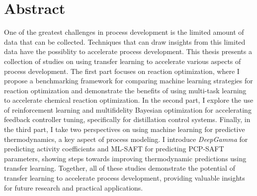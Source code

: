 \begingroup
\let\clearpage\relax
\let\cleardoublepage\relax
\let\cleardoublepage\relax

\chapter*{Abstract}

One of the greatest challenges in process development is the limited amount of data that can be collected. Techniques that can draw insights from this limited data have the possiblity to accelerate process development. This thesis presents a collection of studies on using transfer learning to accelerate various aspects of process development. The first part focuses on reaction optimization, where I propose a benchmarking framework for comparing machine learning strategies for reaction optimization and demonstrate the benefits of using multi-task learning to accelerate chemical reaction optimization. In the second part, I explore the use of reinforcement learning and multifidelity Bayesian optimization for accelerating feedback controller tuning, specifically for distillation control systems. Finally, in the third part, I take two perspectives on using machine learning for predictive thermodynamics, a key aspect of process modeling. I introduce \textit{DeepGamma} for predicting activity coefficients and ML-SAFT for predicting PCP-SAFT parameters, showing steps towards improving thermodynamic predictions using transfer learning. Together, all of these studies demonstrate the potential of transfer learning to accelerate process development, providing valuable insights for future research and practical applications.

\vfill

\endgroup			

\vfill